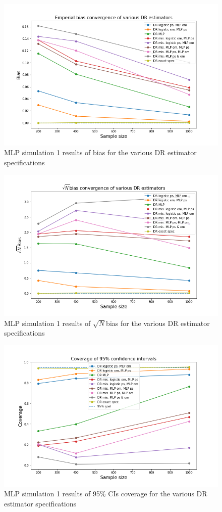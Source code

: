 \documentclass[12pt,twoside]{article}
\begin{document}
\begin{figure}[h!]
    \centering
    \includegraphics[width = 0.9\columnwidth]{figures/biasMLP_moreW.png}
    \caption{MLP simulation 1 results of bias for the various DR estimator specifications}
    \label{figbiasMLP_moreW}
\end{figure}

\begin{figure}[h!]
    \centering
    \includegraphics[width = 0.9\columnwidth]{figures/sqrtnMLP_moreW.png}
    \caption{MLP simulation 1 results of $\sqrt{N}$bias for the various DR estimator specifications}
    \label{figsqrtnMLP_moreW}
\end{figure}
\begin{figure}[h!]
    \centering
    \includegraphics[width = 0.9\columnwidth]{figures/CIMLP_moreW.png}
    \caption{MLP simulation 1 results of 95\% CIs coverage for the various DR estimator specifications}
    \label{figCIMLP_moreW}
\end{figure}
\end{document}
